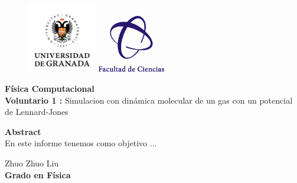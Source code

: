 \documentclass[11pt, twoside]{article} %
\begin{document}
\begin{figure}[h!]
	\includegraphics[width=3cm]{Icons/ugr.jpg}
	\endminipage
	\includegraphics[height = 2.5cm, width=3cm]{Icons/facultad_ciencias.png}
	\endminipage
\end{figure}

\vspace{0.3cm}

\begin{center}
    \Huge \textbf{Física Computacional}\\
    		\vspace{0.4cm}
    \LARGE \textbf{Voluntario 1 :}  
    Simulacion con dinámica molecular de un gas con un potencial de Lennard-Jones
\end{center}

\vspace{1cm}

\vspace{1cm}

\begin{center}
    \large \textbf{Abstract}\\
    		\vspace{0.2cm}
    \normalsize
    En este informe tenemos como objetivo ...

\end{center}

\vspace{1cm}

\begin{flushright}
    \large Zhuo Zhuo Liu 
    \\
    \vspace{0.4cm}
    \textbf{Grado en Física}
\end{flushright}

\newpage

\setcounter{page}{0}
\tableofcontents
\newpage
\end{document}
